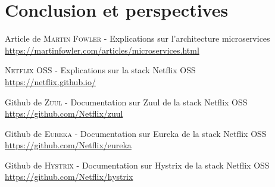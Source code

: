 \documentclass[11pt,twoside]{scrreprt}
\begin{document}
	
	
\chapter*{Conclusion et perspectives} %
	
	

\begin{thebibliography}{9}

%

		Article de \textsc{Martin Fowler - }\textsf{Explications sur l'architecture microservices} \\
		\url{https://martinfowler.com/articles/microservices.html}
		
		\textsc{Netflix OSS - }\textsf{Explications sur la stack Netflix OSS} \\
		\url{https://netflix.github.io/}

		Github de \textsc{Zuul - }\textsf{Documentation sur Zuul de la stack Netflix OSS} \\
		\url{https://github.com/Netflix/zuul}
		
		Github de \textsc{Eureka - }\textsf{Documentation sur Eureka de la stack Netflix OSS} \\
		\url{https://github.com/Netflix/eureka}

		Github de \textsc{Hystrix - }\textsf{Documentation sur Hystrix de la stack Netflix OSS} \\
		\url{https://github.com/Netflix/hystrix}

\end{thebibliography}
\end{document}
